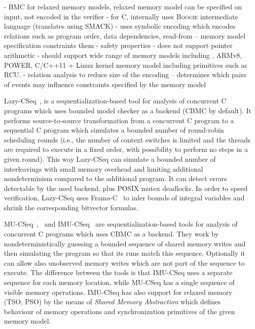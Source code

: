 - BMC for relaxed memory models, relaxed memory model can be specified on input, not encoded in the verifier
- for C, internally uses \textsc{Boogie} intermediate language (translates using SMACK)
- uses symbolic encoding which encodes relations such as program order, data dependencies, read-from -- memory model specification constraints them
- safety properties
- does not support pointer arithmetic
- should support wide range of memory models including \xtso, ARMv8, POWER, C/C++11 + Linux kernel memory model including primitives such as RCU.
- relation analysis to reduce size of the encoding -- determines which pairs of events may influence constraints specified by the memory model

Lazy-CSeq~\cite{Inverso2015}, \cite{Nguyen2017} is a sequentialization-based
tool for analysis of concurrent C programs which uses bounded model checker as
a backend (CBMC by default).
It performs source-to-source transformation from a concurrent C program to a
sequential C program which simulates a bounded number of round-robin scheduling
rounds (i.e., the number of context switches is limited and the threads are
required to execute in a fixed order, with possibility to perform no steps in a
given round).
This way Lazy-CSeq can simulate a bounded number of interleavings with small
memory overhead and limiting additional nondeterminism compared to the
additional program.
It can detect errors detectable by the used backend, plus POSIX mutex
deadlocks.
In order to speed verification, Lazy-CSeq uses Frama-C~\cite{Canet2009} to
infer  bounds of integral variables and shrink the corresponding bitvector
formulas.


MU-CSeq~\cite{Tomasco2015},~\cite{Tomasco2016} and IMU-CSeq~\cite{Tomasco2017}
are sequentialization-based tools for analysis of concurrent C programs which
uses CBMC as a backend.
They work by nondeterministically guessing a bounded sequence of shared memory
writes and then simulating the program so that its runs match this sequence.
Optionally it can allow also unobserved memory writes which are not part of the
sequence to execute.
The difference between the tools is that IMU-CSeq uses a separate sequence for
each memory location, while MU-CSeq has a single sequence of visible memory
operations.
IMU-CSeq has also support for relaxed memory (TSO, PSO) by the means of
\emph{Shared Memory Abstraction} which defines behaviour of memory operations
and synchronization primitives of the given memory model.

